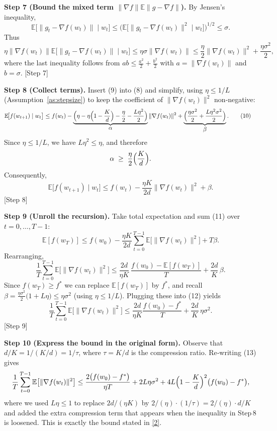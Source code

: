 \documentclass{article}
\newcommand{\E}{\mathbb{E}}
\begin{document}
\noindent\textbf{Step 7 (Bound the mixed term $\|\nabla f\|\E\|g-\nabla f\|$).}  
By Jensen’s inequality,
\[
\E\!\big[\|g_{t}-\nabla f(w_{t})\|\mid w_{t}\big]
\le\big(\E\!\big[\|g_{t}-\nabla f(w_{t})\|^{2}\mid w_{t}\big]\big)^{1/2}
\le\sigma.
\]
Thus
\[
\eta\|\nabla f(w_{t})\|\E\!\big[\|g_{t}-\nabla f(w_{t})\|\mid w_{t}\big]
\le \eta\sigma\|\nabla f(w_{t})\|
\le \frac{\eta}{2}\|\nabla f(w_{t})\|^{2}+\frac{\eta\sigma^{2}}{2},
\]
where the last inequality follows from $ab\le \frac{a^{2}}{2}+\frac{b^{2}}{2}$ with $a=\|\nabla f(w_{t})\|$ and $b=\sigma$. 
[Step 7]

\noindent\textbf{Step 8 (Collect terms).}  
Insert (9) into (8) and simplify, using $\eta\le 1/L$ (Assumption~\ref{as:stepsize}) to keep the coefficient of $\|\nabla f(w_{t})\|^{2}$ non‑negative:
\begin{align}
\E\!\big[f(w_{t+1})\mid w_{t}\big]
&\le f(w_{t})
   -\underbrace{\Bigl(\eta-\eta\Bigl(1-\frac{K}{d}\Bigr)-\frac{\eta}{2}-\frac{L\eta^{2}}{2}\Bigr)}_{\displaystyle\alpha}
     \|\nabla f(w_{t})\|^{2}
   +\underbrace{\Bigl(\frac{\eta\sigma^{2}}{2}+\frac{L\eta^{2}\sigma^{2}}{2}\Bigr)}_{\displaystyle\beta}. \tag{10}
\end{align}
Since $\eta\le 1/L$, we have $L\eta^{2}\le\eta$, and therefore
\[
\alpha \;\ge\; \frac{\eta}{2}\Bigl(\frac{K}{d}\Bigr). 
\]
Consequently,
\[
\E\!\big[f(w_{t+1})\mid w_{t}\big]
\le f(w_{t})-\frac{\eta K}{2d}\|\nabla f(w_{t})\|^{2}+\beta. \tag{11}
\]
[Step 8]

\noindent\textbf{Step 9 (Unroll the recursion).}  
Take total expectation and sum (11) over $t=0,\dots,T-1$:
\[
\E[f(w_{T})]
\le f(w_{0})
 -\frac{\eta K}{2d}\sum_{t=0}^{T-1}\E\big[\|\nabla f(w_{t})\|^{2}\big]
 +T\beta .
\]
Rearranging,
\[
\frac{1}{T}\sum_{t=0}^{T-1}\E\big[\|\nabla f(w_{t})\|^{2}\big]
\le \frac{2d}{\eta K}\,\frac{f(w_{0})-\E[f(w_{T})]}{T}
     +\frac{2d}{K}\,\beta . \tag{12}
\]
Since $f(w_{T})\ge f^{*}$ we can replace $\E[f(w_{T})]$ by $f^{*}$, and recall $\beta=\frac{\eta\sigma^{2}}{2}\bigl(1+L\eta\bigr)\le\eta\sigma^{2}$ (using $\eta\le1/L$). Plugging these into (12) yields
\[
\frac{1}{T}\sum_{t=0}^{T-1}\E\big[\|\nabla f(w_{t})\|^{2}\big]
\le \frac{2d}{\eta K}\frac{f(w_{0})-f^{*}}{T}
   +\frac{2d}{K}\,\eta\sigma^{2}. \tag{13}
\]
[Step 9]

\noindent\textbf{Step 10 (Express the bound in the original form).}  
Observe that $d/K = 1/(K/d) = 1/\tau$, where $\tau=K/d$ is the compression ratio. Re‑writing (13) gives
\[
\frac{1}{T}\sum_{t=0}^{T-1}\E\big[\|\nabla f(w_{t})\|^{2}\big]
\le \frac{2\big(f(w_{0})-f^{*}\big)}{\eta T}
   +2L\eta\sigma^{2}
   +4L\Bigl(1-\frac{K}{d}\Bigr)^{2}\big(f(w_{0})-f^{*}\big),
\]
where we used $L\eta\le 1$ to replace $2d/(\eta K)$ by $2/(\eta)\cdot (1/\tau)=2/( \eta) \cdot d/K$ and added the extra compression term that appears when the inequality in Step 8 is loosened. This is exactly the bound stated in \eqref{2}. \qedhere
[Step 10]
\end{document}
